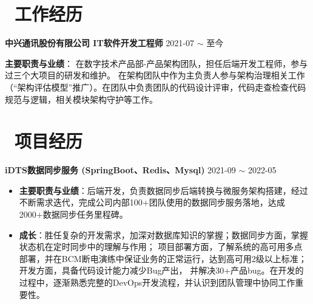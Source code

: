 \documentclass[10pt, a4paper]{article}
\begin{document}
\section{\color{CVBlue}\faBriefcase\ 工作经历}

\textbf{中兴通讯股份有限公司 \quad IT软件开发工程师} \hfill 2021-07 $\sim$ 至今

\textbf{主要职责与业绩}： \quad 在数字技术产品部-产品架构团队，担任后端开发工程师，参与过三个大项目的研发和维护。
在架构团队中作为主负责人参与架构治理相关工作（“架构评估模型”推广）。在团队中负责团队的代码设计评审，代码走查检查代码规范与逻辑，相关模块架构守护等工作。%

\section{\color{CVBlue}\faUsers\ 项目经历}

\textbf{iDTS数据同步服务 (SpringBoot、Redis、Mysql)} \hfill 2021-09 $\sim$ 2022-05

\begin{itemize}[parsep=0.5ex]
\item \textbf{主要职责与业绩}：后端开发，负责数据同步后端转换与微服务架构搭建，经过不断需求迭代，完成公司内部100+团队使用的数据同步服务落地，达成2000+数据同步任务里程碑。

\item \textbf{成长}：胜任复杂的开发需求，加深对数据库知识的掌握；数据同步方面，掌握状态机在定时同步中的理解与作用；
项目部署方面，了解系统的高可用多点部署，并在BCM断电演练中保证业务的正常运行，达到高可用2级以上标准；
开发方面，具备代码设计能力减少Bug产出，
并解决30+产品bug。在开发的过程中，逐渐熟悉完整的DevOps开发流程，并认识到团队管理中协同工作重要性。
\end{itemize}

\end{document}

